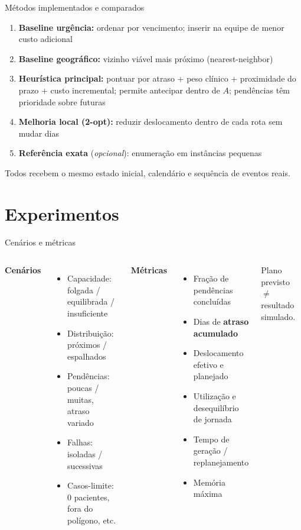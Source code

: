 \documentclass[aspectratio=169]{beamer}
\begin{document}
\begin{frame}{M\'etodos implementados e comparados}
  \begin{enumerate}
    \item \textbf{Baseline urg\^encia:} ordenar por vencimento; inserir na equipe de menor custo adicional
    \item \textbf{Baseline geogr\'afico:} vizinho vi\'avel mais pr\'oximo (nearest-neighbor)
    \item \textbf{Heur\'istica principal:} pontuar por atraso + peso cl\'inico + proximidade do prazo + custo incremental; permite antecipar dentro de $A$; pend\^encias t\^em prioridade sobre futuras
    \item \textbf{Melhoria local (2-opt):} reduzir deslocamento dentro de cada rota sem mudar dias
    \item \textbf{Refer\^encia exata} (\emph{opcional}): enumera\c{c}\~ao em inst\^ancias pequenas
  \end{enumerate}
  \vspace{0.3em}
  {\small Todos recebem o mesmo estado inicial, calend\'ario e sequ\^encia de eventos reais.}
\end{frame}

\section{Experimentos}

\begin{frame}{Cen\'arios e m\'etricas}
  \begin{columns}[T]
      \textbf{Cen\'arios}
      \begin{itemize}
        \item Capacidade: folgada / equilibrada / insuficiente
        \item Distribui\c{c}\~ao: pr\'oximos / espalhados
        \item Pend\^encias: poucas / muitas, atraso variado
        \item Falhas: isoladas / sucessivas
        \item Casos-limite: 0 pacientes, fora do pol\'igono, etc.
      \end{itemize}
      \textbf{M\'etricas}
      \begin{itemize}
        \item Fra\c{c}\~ao de pend\^encias conclu\'idas
        \item Dias de \textbf{atraso acumulado}
        \item Deslocamento efetivo e planejado
        \item Utiliza\c{c}\~ao e desequil\'ibrio de jornada
        \item Tempo de gera\c{c}\~ao / replanejamento
        \item Mem\'oria m\'axima
      \end{itemize}
      \vspace{0.2em}
      {\small Plano previsto $\neq$ resultado simulado.}
  \end{columns}
\end{frame}
\end{document}
